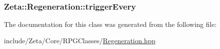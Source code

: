 \hypertarget{classZeta_1_1Regeneration_a6aad295d1fb310f9bd575baaa8d124a3}{
\subsubsection[{trigger\+Every}]{ Zeta\+::\+Regeneration\+::trigger\+Every\hspace{0.3cm}{\ttfamily [private]}}}\label{classZeta_1_1Regeneration_a6aad295d1fb310f9bd575baaa8d124a3}


The documentation for this class was generated from the following file\+:\begin{DoxyCompactItemize}
\item 
include/\+Zeta/\+Core/\+R\+P\+G\+Classes/\hyperlink{Regeneration_8hpp}{Regeneration.\+hpp}\end{DoxyCompactItemize}
